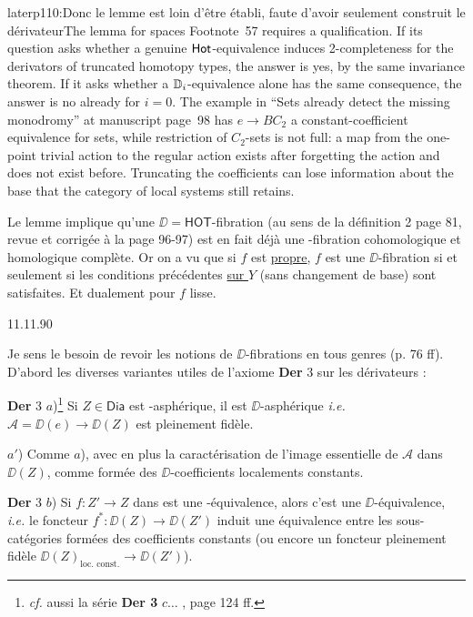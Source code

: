 \begin{dcomment}{later}{p110:Donc le lemme est loin d'être établi, faute d'avoir seulement construit le dérivateur}{The lemma for spaces}
Footnote~57 requires a qualification. If its question asks whether a genuine $\mathsf{Hot}$-equivalence induces 2-completeness for the derivators of truncated homotopy types, the answer is yes, by the same invariance theorem. If it asks whether a $\mathbb{D}_i$-equivalence alone has the same consequence, the answer is no already for $i=0$. The example in ``Sets already detect the missing monodromy'' at manuscript page~98 has $e\to BC_2$ a constant-coefficient equivalence for sets, while restriction of $C_2$-sets is not full: a map from the one-point trivial action to the regular action exists after forgetting the action and does not exist before. Truncating the coefficients can lose information about the base that the category of local systems still retains.
\end{dcomment}




Le lemme implique qu'une $\DD = \mathsf{HOT}$-fibration (au sens de la définition 2 page 81, revue et corrigée à la page 96-97) est en fait déjà une \HOT-fibration cohomologique et homologique complète. Or on a vu que si $f$ est \underline{propre}, $f$ est une $\DD$-fibration si et seulement si les conditions précédentes \underline{sur $Y$} (sans changement de base) sont satisfaites. Et dualement pour $f$ lisse.

\begin{flushright}
11.11.90
\end{flushright}

Je sens le besoin de revoir les notions de $\DD$-fibrations en tous genres (p. 76 ff). D'abord les diverses variantes utiles de l'axiome \textbf{Der} 3 sur les dérivateurs :

\textbf{Der} 3 $a$)\footnote[58]{\textit{cf.} aussi la série \textbf{Der 3} $c \ldots$ , page 124 ff.} Si $Z \in \mathsf{Dia}$ est \Hot-asphérique, il est $\DD$-asphérique \textit{i.e.} $\mathcal{A} = \DD(e) \to \DD(Z)$ est pleinement fidèle. %

$a'$) Comme $a$), avec en plus la caractérisation de l'image essentielle de $\mathcal{A}$ dans $\DD(Z)$, comme formée des $\DD$-coefficients localements constants. %

\textbf{Der} 3 $b$) Si $f : Z' \to Z$ dans \Dia{} est une \Hot-équivalence, alors c'est une $\DD$-équivalence, \textit{i.e.} le foncteur $f^{*} : \DD(Z) \to \DD(Z')$ induit une équivalence entre les sous-catégories formées des coefficients constants (ou encore un foncteur pleinement fidèle $\DD(Z)_{\text{loc. const.}} \longrightarrow \DD(Z')$).

